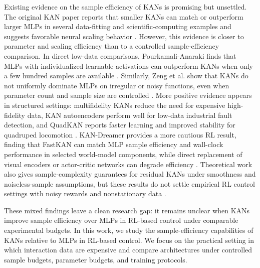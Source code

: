 \documentclass{article}
\begin{document}
Existing evidence on the sample efficiency of KANs is promising but unsettled.
The original KAN paper reports that smaller KANs can match or outperform larger MLPs in several data-fitting and scientific-computing examples and suggests favorable neural scaling behavior \cite{liu2024kan}.
However, this evidence is closer to parameter and scaling efficiency than to a controlled sample-efficiency comparison.
In direct low-data comparisons, Pourkamali-Anaraki finds that MLPs with individualized learnable activations can outperform KANs when only a few hundred samples are available \cite{pourkamali2025lowdata}.
Similarly, Zeng et al. show that KANs do not uniformly dominate MLPs on irregular or noisy functions, even when parameter count and sample size are controlled \cite{zeng2024irregular}.
More positive evidence appears in structured settings: multifidelity KANs reduce the need for expensive high-fidelity data, KAN autoencoders perform well for low-data industrial fault detection, and QuadKAN reports faster learning and improved stability for quadruped locomotion \cite{howard2024multifidelity,villagomez2025kanae,wang2025quadkan}.
KAN-Dreamer provides a more cautious RL result, finding that FastKAN can match MLP sample efficiency and wall-clock performance in selected world-model components, while direct replacement of visual encoders or actor-critic networks can degrade efficiency \cite{shi2025kandreamer}.
Theoretical work also gives sample-complexity guarantees for residual KANs under smoothness and noiseless-sample assumptions, but these results do not settle empirical RL control settings with noisy rewards and nonstationary data \cite{kratsios2025besov}.

These mixed findings leave a clean research gap: it remains unclear when KANs improve sample efficiency over MLPs in RL-based control under comparable experimental budgets.
In this work, we study the sample-efficiency capabilities of KANs relative to MLPs in RL-based control.
We focus on the practical setting in which interaction data are expensive and compare architectures under controlled sample budgets, parameter budgets, and training protocols.
\end{document}
